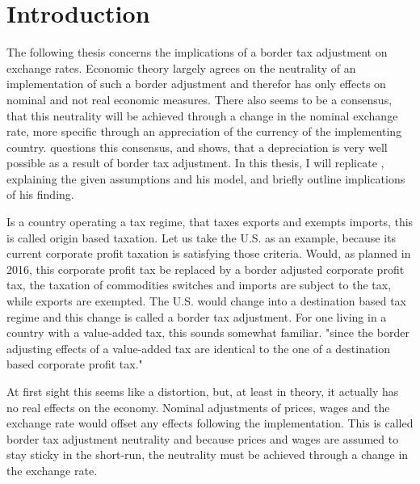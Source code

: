 

\section{Introduction}
The following thesis concerns the implications of a border tax adjustment on exchange rates. Economic theory largely agrees on the neutrality of an implementation of such a border adjustment and therefor has only effects on nominal and not real economic measures. There also seems to be a consensus, that this neutrality will be achieved through a change in the nominal exchange rate, more specific through an appreciation of the currency of the implementing country. \cite{buiter2017exchange} questions this consensus, and shows, that a depreciation is very well possible as a result of border tax adjustment. In this thesis, I will replicate \cite{buiter2017exchange}, explaining the given assumptions and his model, and briefly outline implications of his finding.  


Is a country operating a tax regime, that taxes exports and exempts imports, this is called origin based taxation. Let us take the U.S. as an example, because its current corporate profit taxation is satisfying those criteria. Would, as planned in 2016, this corporate profit tax be replaced by a border adjusted corporate profit tax, the taxation of commodities switches and imports are subject to the tax, while exports are exempted. The U.S. would change into a destination based tax regime and this change is called a border tax adjustment. For one living in a country with a value-added tax, this sounds somewhat familiar. "since the border adjusting effects of a value-added tax are identical to the one of a destination based corporate profit tax."


At first sight this seems like a distortion, but, at least in theory, it actually has no real effects on the economy. Nominal adjustments of prices, wages and the exchange rate would offset any effects following the implementation. This is called border tax adjustment neutrality and because prices and wages are assumed to stay sticky in the short-run, the neutrality must be achieved through a change in the exchange rate.

